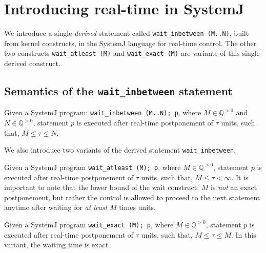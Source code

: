 \section{Introducing real-time in SystemJ}
\label{sec:intr-real-time}

We introduce a single \textit{derived} statement called
\mbox{\texttt{wait\_inbetween (M..N)}}, built from kernel constructs, in
the SystemJ language for real-time control. The other two constructs
\mbox{\texttt{wait\_atleast (M)}} and \mbox{\texttt{wait\_exact (M)}}
are variants of this single derived construct.



\subsection{Semantics of the \texttt{wait\_inbetween} statement}
\label{sec:semant-delay-stat}


Given a  SystemJ program:  \texttt{wait\_inbetween (M..N); p},  where $M
\in  \mathbb{Q}^{>0}$  and $N  \in  \mathbb{Q}^{>0}$,  statement $p$  is
executed after  real-time postponement  of $\tau$  units, such  that, $M
\leq \tau \leq N$.

We also introduce two variants of the derived statement
\texttt{wait\_inbetween}.
\begin{enumerate*}
\item Given a SystemJ program \texttt{wait\_atleast (M); p}, where $M
  \in \mathbb{Q}^{>0}$, statement $p$ is executed after real-time
  postponement of $\tau$ units, such that, $M \leq \tau < \infty$. It is
  important to note that the lower bound of the wait construct; $M$ is
  \textit{not} an exact postponement, but rather the control is allowed
  to proceed to the next statement anytime after waiting for \textit{at
    least} $M$ times units.
\item Given a SystemJ program \texttt{wait\_exact (M); p}, where $M \in
  \mathbb{Q}^{>0}$, statement $p$ is executed after real-time
  postponement of $\tau$ units, such that, $M \leq \tau \leq M$. In this
  variant, the waiting time is exact.
\end{enumerate*}

